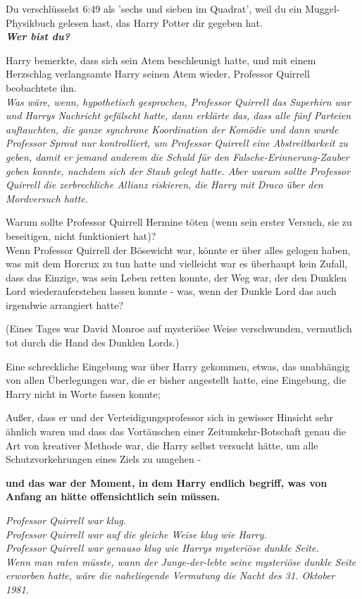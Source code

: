 {Du verschlüsselst 6:49 als 'sechs und sieben im Quadrat', weil du ein Muggel-Physikbuch gelesen hast, das Harry Potter dir gegeben hat.\\

\textbf{\emph{Wer bist du?}}

Harry bemerkte, dass sich sein Atem beschleunigt hatte, und mit einem Herzschlag verlangsamte Harry seinen Atem wieder, Professor Quirrell beobachtete ihn.\\ \emph{\hfill\break Was wäre, wenn, hypothetisch gesprochen, Professor Quirrell das Superhirn war und Harrys Nachricht gefälscht hatte, dann erklärte das, dass alle fünf Parteien auftauchten, die ganze synchrone Koordination der Komödie und dann wurde Professor Sprout nur kontrolliert, um Professor Quirrell eine Abstreitbarkeit zu geben, damit er jemand anderem die Schuld für den Falsche-Erinnerung-Zauber geben konnte, nachdem sich der Staub gelegt hatte. Aber warum sollte Professor Quirrell die zerbrechliche Allianz riskieren, die Harry mit Draco über den Mordversuch hatte.}

Warum sollte Professor Quirrell Hermine töten (wenn sein erster Versuch, sie zu beseitigen, nicht funktioniert hat)?\\ Wenn Professor Quirrell der Bösewicht war, könnte er über alles gelogen haben, was mit dem Horcrux zu tun hatte und vielleicht war es überhaupt kein Zufall, dass das Einzige, was sein Leben retten konnte, der Weg war, der den Dunklen Lord wiederauferstehen lassen konnte - was, wenn der Dunkle Lord das auch irgendwie arrangiert hatte?

(Eines Tages war David Monroe auf mysteriöse Weise verschwunden, vermutlich tot durch die Hand des Dunklen Lords.)

Eine schreckliche Eingebung war über Harry gekommen, etwas, das unabhängig von allen Überlegungen war, die er bisher angestellt hatte, eine Eingebung, die Harry nicht in Worte fassen konnte;

Außer, dass er und der Verteidigungsprofessor sich in gewisser Hinsicht sehr ähnlich waren und dass das Vortäuschen einer Zeitumkehr-Botschaft genau die Art von kreativer Methode war, die Harry selbst versucht hätte, um alle Schutzvorkehrungen eines Ziels zu umgehen -

\textbf{und das war der Moment, in dem Harry endlich begriff, was von Anfang an hätte offensichtlich sein müssen.}

\emph{Professor Quirrell war klug.\\ Professor Quirrell war auf die gleiche Weise klug wie Harry.\\ Professor Quirrell war genauso klug wie Harrys mysteriöse dunkle Seite.\\ Wenn man raten müsste, wann der Junge-der-lebte seine mysteriöse dunkle Seite erworben hatte, wäre die naheliegende Vermutung die Nacht des 31. Oktober 1981.}

}
